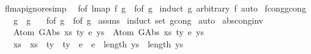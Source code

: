 \begin{isabellebody}
\isanewline
\isanewline
{}\isamarkupfalse%
\ f{\isacharunderscore}{\kern0pt}lmap{\isacharunderscore}{\kern0pt}ignore{\isacharbrackleft}{\kern0pt}simp{\isacharbrackright}{\kern0pt}{\isacharcolon}{\kern0pt}\isanewline
\ \ {\isachardoublequoteopen}f{\isacharunderscore}{\kern0pt}of\ {\isacharparenleft}{\kern0pt}lmap\ f\ g{\isacharparenright}{\kern0pt}\ {\isacharequal}{\kern0pt}\ f{\isacharunderscore}{\kern0pt}of\ g{\isachardoublequoteclose}\isanewline
%
\isadelimproof
%
\endisadelimproof
%
\isatagproof
{}\isamarkupfalse%
\ {\isacharparenleft}{\kern0pt}induct\ g\ arbitrary{\isacharcolon}{\kern0pt}\ f{\isacharparenright}{\kern0pt}\ auto%
\endisatagproof
{\isafoldproof}%
%
\isadelimproof
\isanewline
%
\endisadelimproof
\isanewline
\isanewline
{}\isamarkupfalse%
\ f{\isacharunderscore}{\kern0pt}cong{\isacharunderscore}{\kern0pt}gcong{\isacharcolon}{\kern0pt}\isanewline
\ \ \ {\isachardoublequoteopen}g{}\ {\isasymsimeq}\ g{}{\isachardoublequoteclose}\isanewline
\ \ \ {\isachardoublequoteopen}f{\isacharunderscore}{\kern0pt}of\ g{}\ {\isacharequal}{\kern0pt}\ f{\isacharunderscore}{\kern0pt}of\ g{}{\isachardoublequoteclose}\isanewline
%
\isadelimproof
%
\endisadelimproof
%
\isatagproof
{}\isamarkupfalse%
\ assms\isanewline
{}\isamarkupfalse%
\ {\isacharparenleft}{\kern0pt}induct\ set{\isacharcolon}{\kern0pt}\ gcong{\isacharparenright}{\kern0pt}\isanewline
{}\isamarkupfalse%
\ auto%
\endisatagproof
{\isafoldproof}%
%
\isadelimproof
\isanewline
%
\endisadelimproof
\isanewline
\isanewline
{}\isamarkupfalse%
\ abs{\isacharunderscore}{\kern0pt}cong{\isacharunderscore}{\kern0pt}inv{\isacharcolon}{\kern0pt}\isanewline
\ \ \ {\isachardoublequoteopen}Atom\ {\isacharparenleft}{\kern0pt}GAbs\ xs{}\ ty{}\ e{}{\isacharparenright}{\kern0pt}\ ys{}\ {\isasymsimeq}\ Atom\ {\isacharparenleft}{\kern0pt}GAbs\ xs{}\ ty{}\ e{}{\isacharparenright}{\kern0pt}\ ys{}{\isachardoublequoteclose}\isanewline
\ \ \ {\isachardoublequoteopen}xs{}\ {\isacharequal}{\kern0pt}\ xs{}\ {\isasymand}\ ty{}\ {\isacharequal}{\kern0pt}\ ty{}\ {\isasymand}\ e{}\ {\isacharequal}{\kern0pt}\ e{}\ {\isasymand}\ length\ ys{}\ {\isacharequal}{\kern0pt}\ length\ ys{}{\isachardoublequoteclose}\isanewline

\end{isabellebody}
